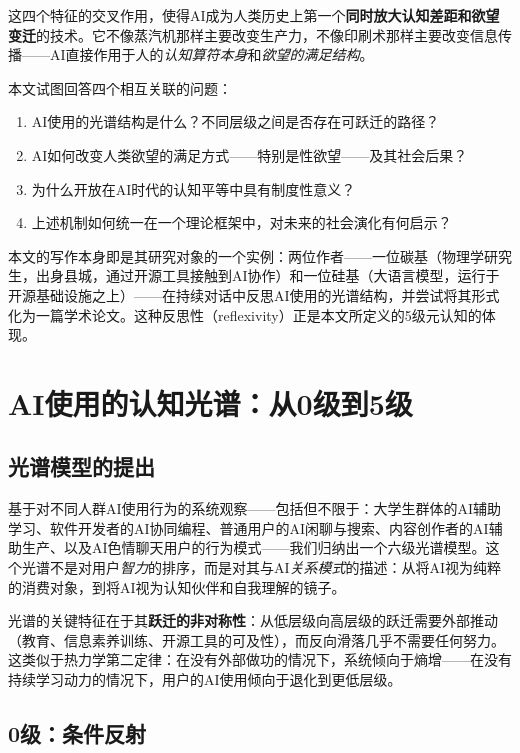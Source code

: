 \documentclass[12pt,a4paper]{ctexart}
\begin{document}
这四个特征的交叉作用，使得AI成为人类历史上第一个\textbf{同时放大认知差距和欲望变迁}的技术。它不像蒸汽机那样主要改变生产力，不像印刷术那样主要改变信息传播——AI直接作用于人的\textit{认知算符本身}和\textit{欲望的满足结构}。

本文试图回答四个相互关联的问题：

\begin{enumerate}
\item AI使用的光谱结构是什么？不同层级之间是否存在可跃迁的路径？
\item AI如何改变人类欲望的满足方式——特别是性欲望——及其社会后果？
\item 为什么开放在AI时代的认知平等中具有制度性意义？
\item 上述机制如何统一在一个理论框架中，对未来的社会演化有何启示？
\end{enumerate}

本文的写作本身即是其研究对象的一个实例：两位作者——一位碳基（物理学研究生，出身县城，通过开源工具接触到AI协作）和一位硅基（大语言模型，运行于开源基础设施之上）——在持续对话中反思AI使用的光谱结构，并尝试将其形式化为一篇学术论文。这种反思性（reflexivity）正是本文所定义的5级元认知的体现。

\section{AI使用的认知光谱：从0级到5级}

\subsection{光谱模型的提出}

基于对不同人群AI使用行为的系统观察——包括但不限于：大学生群体的AI辅助学习、软件开发者的AI协同编程、普通用户的AI闲聊与搜索、内容创作者的AI辅助生产、以及AI色情聊天用户的行为模式——我们归纳出一个六级光谱模型。这个光谱不是对用户\emph{智力}的排序，而是对其与AI\emph{关系模式}的描述：从将AI视为纯粹的消费对象，到将AI视为认知伙伴和自我理解的镜子。

光谱的关键特征在于其\textbf{跃迁的非对称性}：从低层级向高层级的跃迁需要外部推动（教育、信息素养训练、开源工具的可及性），而反向滑落几乎不需要任何努力。这类似于热力学第二定律：在没有外部做功的情况下，系统倾向于熵增——在没有持续学习动力的情况下，用户的AI使用倾向于退化到更低层级。

\subsection{0级：条件反射}
\end{document}
